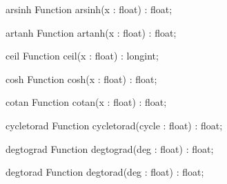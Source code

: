 \FPCexample{}


\begin{function}{arsinh}
\Declaration
Function arsinh(x : float) : float;
\Description

\Errors
\SeeAlso
\end{function}

\FPCexample{}


\begin{function}{artanh}
\Declaration
Function artanh(x : float) : float;
\Description

\Errors
\SeeAlso
\end{function}

\FPCexample{}


\begin{function}{ceil}
\Declaration
Function ceil(x : float) : longint;
\Description

\Errors
\SeeAlso
\end{function}

\FPCexample{}


\begin{function}{cosh}
\Declaration
Function cosh(x : float) : float;
\Description

\Errors
\SeeAlso
\end{function}

\FPCexample{}


\begin{function}{cotan}
\Declaration
Function cotan(x : float) : float;
\Description

\Errors
\SeeAlso
\end{function}

\FPCexample{}


\begin{function}{cycletorad}
\Declaration
Function cycletorad(cycle : float) : float;
\Description

\Errors
\SeeAlso
\end{function}

\FPCexample{}


\begin{function}{degtograd}
\Declaration
Function degtograd(deg : float) : float;
\Description

\Errors
\SeeAlso
\end{function}

\FPCexample{}


\begin{function}{degtorad}
\Declaration
Function degtorad(deg : float) : float;
\Description

\Errors
\SeeAlso
\end{function}

